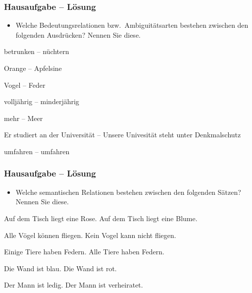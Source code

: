 \begin{frame}
\frametitle{Hausaufgabe -- Lösung}

\begin{itemize}
\item Welche Bedeutungsrelationen bzw.\ Ambiguitätsarten bestehen zwischen den folgenden Ausdrücken? Nennen Sie diese.
\end{itemize}

\settowidth{}
\ea 
	\ea betrunken -- nüchtern \pause 
	
	\ex Orange -- Apfelsine \pause 
	
	\ex Vogel -- Feder \pause 
	
	
	\ex volljährig -- minderjährig \pause 
	
	\ex mehr -- Meer \pause 
	
	\ex Er studiert an der Universität -- Unsere Univesität steht unter Denkmalschutz \pause
	
	\ex umfahren -- umfahren \pause
	\z
\z 

\end{frame}


\begin{frame}
\frametitle{Hausaufgabe -- Lösung}

\begin{itemize}
	\item Welche semantischen Relationen bestehen zwischen den folgenden Sätzen? Nennen Sie diese.
\end{itemize}

\settowidth{}
\ea 
\ea Auf dem Tisch liegt eine Rose.
\ex Auf dem Tisch liegt eine Blume.
\pause 
{}
\z 

\pause 
\medskip

\ex 	
\ea Alle Vögel können fliegen.
\ex Kein Vogel kann nicht fliegen.
\pause 
{}
\z 

\pause 
\medskip

\ex 	
\ea Einige Tiere haben Federn.
\ex Alle Tiere haben Federn.
\pause 
{}
\z

\pause
\medskip

\ex
\ea Die Wand ist blau.
\ex Die Wand ist rot.
\pause
{}
\z

\pause
\medskip

\ex
\ea Der Mann ist ledig.
\ex Der Mann ist verheiratet.
\pause
{}
\z

\z 

\end{frame}

